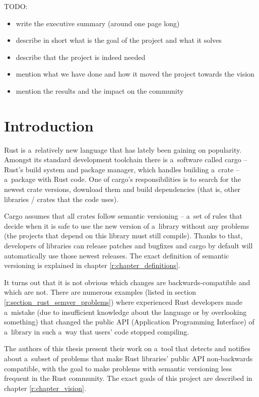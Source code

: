 \documentclass[licencjacka,en]{pracamgr}
\begin{document}
TODO:
\begin{itemize}
	\item write the executive summary (around one page long)
	\item describe in short what is the goal of the project and what it solves
	\item describe that the project is indeed needed
	\item mention what we have done and how it moved the project towards the vision
	\item mention the results and the impact on the community
\end{itemize}

\chapter*{Introduction}

Rust is a~relatively new language that has lately been gaining on popularity. Amongst its standard
development toolchain there is a~software called cargo -- Rust's build system and package manager,
which handles building a~crate -- a~package with Rust code. One of cargo's responsibilities is to
search for the newest crate versions, download them and build dependencies (that is, other
libraries / crates that the code uses).

Cargo assumes that all crates follow semantic versioning -- a~set of rules that decide when it is
safe to use the new version of a~library without any problems (the projects that depend on this
library must still compile). Thanks to that, developers of libraries can release patches and
bugfixes and cargo by default will automatically use those newest releases. The exact definition of
semantic versioning is explained in chapter \ref{r:chapter_definitions}.

It turns out that it is not obvious which changes are backwards-compatible and which are not.
There are numerous examples (listed in section \ref{r:section_rust_semver_problems})
where experienced Rust developers made a~mistake (due to insufficient knowledge about the language
or by overlooking something) that changed the public API (Application Programming Interface)
of a~library in such a~way that users' code stopped compiling.

The authors of this thesis present their work on a~tool that detects and notifies about a~subset of
problems that make Rust libraries' public API non-backwards compatible, with the goal to make
problems with semantic versioning less frequent in the Rust community. The exact goals of this
project are described in chapter \ref{r:chapter_vision}.
\end{document}
